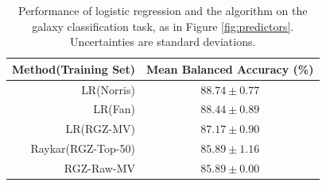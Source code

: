     \begin{table}
      \centering
      \begin{tabular}{r|c}
        \textbf{Method(Training Set)} & \textbf{Mean Balanced Accuracy (\%)}\\\hline
        LR(Norris) & $88.74 \pm 0.77$\\
        LR(Fan) & $88.44 \pm 0.89$\\
        LR(RGZ-MV) & $87.17 \pm 0.90$\\
        Raykar(RGZ-Top-50) & $85.89 \pm 1.16$\\
        RGZ-Raw-MV & $85.89 \pm 0.00$\\
      \end{tabular}
      \caption{Performance of logistic regression and the \citeauthor{raykar10}
        algorithm on the galaxy classification task, as in Figure
        \ref{fig:predictors}. Uncertainties are standard deviations.}
      \label{tab:predictors}
    \end{table}

